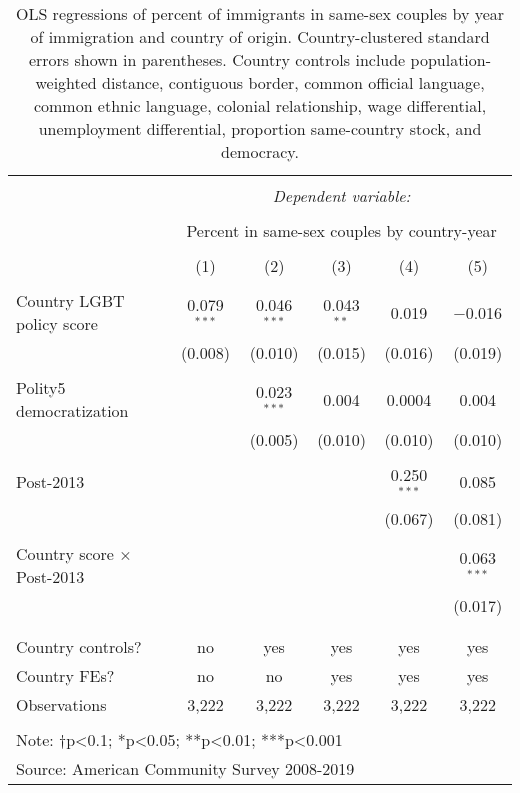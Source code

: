 \documentclass[
  11pt,
]{article}
\begin{document}
\begin{table}[!htbp] \centering 
  \caption{OLS regressions of percent of immigrants in same-sex couples by year of immigration and country of origin. Country-clustered standard errors shown in parentheses. Country controls include population-weighted distance, contiguous border, common official language, common ethnic language, colonial relationship, wage differential, unemployment differential, proportion same-country stock, and democracy.} 
  \label{tab:country-props} 
\begin{tabular}{@{\extracolsep{5pt}}lccccc} 
\\[-1.8ex]\hline 
\hline \\[-1.8ex] 
 & \multicolumn{5}{c}{\textit{Dependent variable:}} \\ 
\cline{2-6} 
\\[-1.8ex] & \multicolumn{5}{c}{Percent in same-sex couples by country-year} \\ 
\\[-1.8ex] & (1) & (2) & (3) & (4) & (5)\\ 
\hline \\[-1.8ex] 
 Country LGBT policy score & 0.079$^{***}$ & 0.046$^{***}$ & 0.043$^{**}$ & 0.019 & $-$0.016 \\ 
  & (0.008) & (0.010) & (0.015) & (0.016) & (0.019) \\ 
  & & & & & \\ 
 Polity5 democratization &  & 0.023$^{***}$ & 0.004 & 0.0004 & 0.004 \\ 
  &  & (0.005) & (0.010) & (0.010) & (0.010) \\ 
  & & & & & \\ 
 Post-2013 &  &  &  & 0.250$^{***}$ & 0.085 \\ 
  &  &  &  & (0.067) & (0.081) \\ 
  & & & & & \\ 
 Country score × Post-2013 &  &  &  &  & 0.063$^{***}$ \\ 
  &  &  &  &  & (0.017) \\ 
  & & & & & \\ 
\hline \\[-1.8ex] 
Country controls? & no & yes & yes & yes & yes \\ 
Country FEs? & no & no & yes & yes & yes \\ 
Observations & 3,222 & 3,222 & 3,222 & 3,222 & 3,222 \\ 
\hline 
\hline \\[-1.8ex] 
\multicolumn{6}{l}{Note: †p<0.1; *p<0.05; **p<0.01; ***p<0.001} \\ 
\multicolumn{6}{l}{Source: American Community Survey 2008-2019} \\ 
\end{tabular} 
\end{table}
\end{document}
